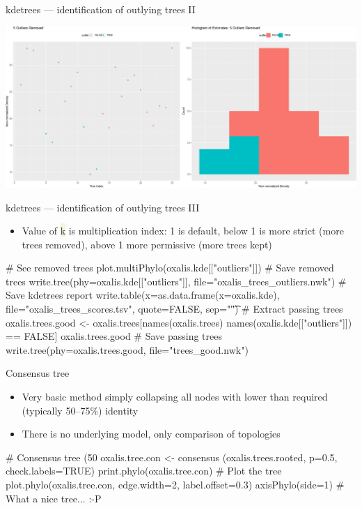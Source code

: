 \documentclass[compress, xelatex, 11pt, xcolor=svgnames, aspectratio=169,
	hyperref={
		bookmarks=true,
		unicode=true,
		colorlinks=true,
		pdftitle={Molecular data in R},
		plainpages=false,
		pdfauthor={Vojtech Zeisek},
		pdfsubject={Course about phylogeny and evolution in R},
		pdfcreator={XeLaTeX},
		pdfkeywords={R, evolution, phylogeny, molecular data},
		linkcolor=Crimson, %
		anchorcolor=Magenta, %
		citecolor=Magenta, %
		filecolor=Magenta, %
		menucolor=Magenta, %
		urlcolor=DodgerBlue, %
		},
	url={hyphens, lowtilde} %
	]{beamer}
\renewcommand{\texttt}[1]{\colorbox{Beige}{{\ttfamily #1}}}
\begin{document}
\begin{frame}{kdetrees --- identification of outlying trees II}
	\begin{center}
		\includegraphics[width=\textwidth-1cm]{kdetrees.png}
	\end{center}
\end{frame}

\begin{frame}[fragile]{kdetrees --- identification of outlying trees III}
	\begin{itemize}
		\item Value of \texttt{k} is multiplication index: 1 is default, below 1 is more strict (more trees removed), above 1 more permissive (more trees kept)
	\end{itemize}
	\begin{spluscode}
    # See removed trees
    plot.multiPhylo(oxalis.kde[["outliers"]])
    # Save removed trees
    write.tree(phy=oxalis.kde[["outliers"]], file="oxalis_trees_outliers.nwk")
    # Save kdetrees report
    write.table(x=as.data.frame(x=oxalis.kde), file="oxalis_trees_scores.tsv",
      quote=FALSE, sep="\t")
    # Extract passing trees
    oxalis.trees.good <- oxalis.trees[names(oxalis.trees) %
      names(oxalis.kde[["outliers"]]) == FALSE]
    oxalis.trees.good
    # Save passing trees
    write.tree(phy=oxalis.trees.good, file="trees_good.nwk")
	\end{spluscode}
\end{frame}

\begin{frame}[fragile]{Consensus tree}
	\begin{multicols}{2}
		\begin{center}
			\texttt{[image: oxalis-cons.png]}
		\end{center}
		\begin{itemize}
			\item Very basic method simply collapsing all nodes with lower than required (typically 50--75\%) identity
			\item There is no underlying model, only comparison of topologies
		\end{itemize}
		\begin{spluscode}
    # Consensus tree (50%
    oxalis.tree.con <- consensus
      (oxalis.trees.rooted, p=0.5,
      check.labels=TRUE)
    print.phylo(oxalis.tree.con)
    # Plot the tree
    plot.phylo(oxalis.tree.con,
      edge.width=2, label.offset=0.3)
    axisPhylo(side=1)
    # What a nice tree... :-P
		\end{spluscode}
	\end{multicols}
\end{frame}
\end{document}
